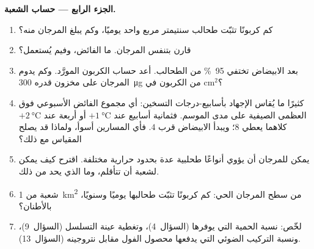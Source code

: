 \begin{problem}
\medskip
\noindent\textbf{الجزء الرابع --- حساب الشعبة.}
\begin{enumerate}[resume]
  \item كم كربونًا تثبّت طحالب سنتيمتر مربع واحد يوميًا،
        وكم يبلغ المرجان منه؟
  \item قارن بتنفس المرجان. ما الفائض، وفيم يُستعمل؟
  \item بعد الابيضاض تختفي \qty{95}{\%} من الطحالب. أعد حساب
        الكربون المورَّد. وكم يدوم المرجان على مخزون قدره
        \qty{300}{\micro g} من الكربون في cm$^{2}$؟
  \item كثيرًا ما يُقاس الإجهاد بأسابيع-درجات التسخين: أي
        مجموع الفائض الأسبوعي فوق العظمى الصيفية على مدى
        الموسم. فثمانية أسابيع عند $+\qty{1}{\celsius}$ أو
        أربعة عند $+\qty{2}{\celsius}$ كلاهما يعطي $8$؛
        ويبدأ الابيضاض قرب $4$. فأي المسارين أسوأ، ولماذا
        قد يصلح المقياس مع ذلك؟
  \item يمكن للمرجان أن يؤوي أنواعًا طحلبية عدة بحدود
        حرارية مختلفة. اقترح كيف يمكن لشعبة أن تتأقلم، وما
        الذي يحد من ذلك.
  \item شعبة من \qty{1}{km^2} من سطح المرجان الحي: كم
        كربونًا تثبّت طحالبها يوميًا وسنويًا، بالأطنان؟
  \item لخّص: نسبة الحمية التي يوفرها 
        (السؤال~4)، وتغطية عينة التسلسل (السؤال~9)، ونسبة
        التركيب الضوئي التي يدفعها محصول الفول مقابل
        نتروجينه (السؤال~13).
\end{enumerate}
\end{problem}

